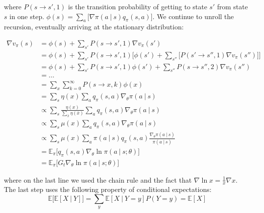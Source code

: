 \documentclass{article}
\newcommand{\giv}{\ |\ }
\begin{document}
where $P(s \to s', 1)$ is the transition probability of getting to state $s'$ from state $s$ in one step. $\phi(s) = \sum_a \bigg[ \nabla \pi(a \giv s) q_\pi (s, a) \bigg]$. We continue to unroll the recursion, eventually arriving at the stationary distribution:

\begin{align*}
    \nabla v_\pi(s) &= \phi(s) + \sum_{s'} P(s \to s', 1) \nabla v_\pi(s') \\
    &= \phi(s) + \sum_{s'} P(s \to s', 1) \bigg[
        \phi(s') + \sum_{s''} \big[
            P(s' \to s'', 1) \nabla v_\pi(s'')
        \bigg]
    \bigg] \\
    &= \phi(s) + \sum_{s'} P(s \to s', 1)
        \phi(s') + \sum_{s''}
            P(s \to s'', 2) \nabla v_\pi(s'')\\
    &= \dots \\
    &=\sum_x \sum_{k = 0}^\infty P(s \to x, k) \phi(x) \\
    &= \sum_s \eta(x) \sum_a  q_\pi(s, a)
        \nabla_\theta \pi(a \giv s) \\
    &\propto \sum_s \frac{\eta(x)}{\sum_{\bar{x}} \eta(\bar{x})} \sum_a  q_\pi(s, a)
    \nabla_\theta \pi(a \giv s) \\
    &\propto \sum_s \mu(x) \sum_a  q_\pi(s, a)
    \nabla_\theta \pi(a \giv s) \\
    &\propto \sum_s \mu(x) \sum_a \pi(a \giv s) q_\pi(s, a) \frac{
        \nabla_\theta \pi(a \giv s)
    }{
        \pi(a \giv s)
    } \\
    &= \mathbb{E}_\pi \big[
        q_\pi(s, a) \nabla_\theta \ln \pi(a \giv s; \theta)
    \big] \\
    &= \mathbb{E}_\pi \big[
        G_t \nabla_\theta \ln \pi(a \giv s; \theta)
    \big]
\end{align*}

where on the last line we used the chain rule and the fact that $\nabla \ln x = \frac{1}{x} \nabla x$. The last step uses the following property of conditional expectations:
\begin{equation*}
    \mathbb{E}\big[ \mathbb{E} [X \giv Y] \big] = 
       \sum_y \mathbb{E} [X \giv Y = y] P(Y = y) = \mathbb{E}[X]
\end{equation*}
\end{document}
